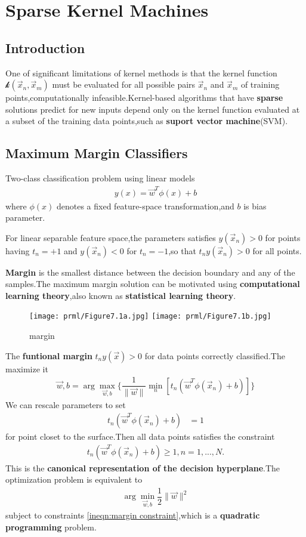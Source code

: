 \chapter{Sparse Kernel Machines}
\label{chap:Sparse Kernel Machines}
\section{Introduction}
One of significant limitations of kernel methods is that the kernel function $\mathcal{k}(\vec{x}_n,\vec{x}_m)$ must be evaluated for all possible pairs $\vec{x}_n$ and $\vec{x}_m$ of training points,computationally infeasible.Kernel-based algorithms that have \textbf{sparse} solutions predict for new inputs depend only on the kernel function evaluated at a subset of the training data points,such as \textbf{suport vector machine}(SVM).
\section{Maximum Margin Classifiers}
Two-class classification problem using linear models
\begin{align}\label{eqn:maximum margin classifier regpresentation}
y(x) = \vec{w}^T\phi(x)+b
\end{align}
where $\phi(x)$ denotes a fixed feature-space transformation,and $b$ is bias parameter.

For linear separable feature space,the parameters satisfies $y(\vec{x}_n)>0$ for points having $t_n=+1$ and $y(\vec{x}_n)<0$ for $t_n=-1$,so that $t_ny(\vec{x}_n)>0$ for all points.

\textbf{Margin} is the smallest distance between the decision boundary and any of the samples.The maximum margin solution can be motivated using \textbf{computational learning theory},also known as \textbf{statistical learning theory}.
\begin{figure*}

	\texttt{[image: prml/Figure7.1a.jpg]}
	\texttt{[image: prml/Figure7.1b.jpg]}
	\caption{margin}
\end{figure*}

The \textbf{funtional margin} $t_ny(\vec{x}) > 0$ for data points correctly classified.The maximize it
\begin{align}
\vec{w},b = \arg\max\limits_{\vec{w},b}\{\dfrac{1}{\parallel\vec{w}\parallel}\min_n
[t_n(\vec{w}^T\phi(\vec{x}_n)+b)] \}
\end{align}
We can rescale parameters to set
\begin{align}
t_n(\vec{w}^T\phi(\vec{x}_n)+b) &= 1
\end{align}
for point closet to the surface.Then all data points satisfies the constraint
\begin{align}\label{ineqn:margin constraint}
t_n(\vec{w}^T\phi(\vec{x}_n)+b) \geq 1,n=1,...,N.
\end{align}
This is the \textbf{canonical representation of the decision hyperplane}.The optimization problem is equivalent to
\begin{align}
\arg\min\limits_{\vec{w},b}\dfrac{1}{2}\parallel\vec{w}\parallel^2
\end{align}
subject to constraints \ref{ineqn:margin constraint},which is a \textbf{quadratic programming} problem.

